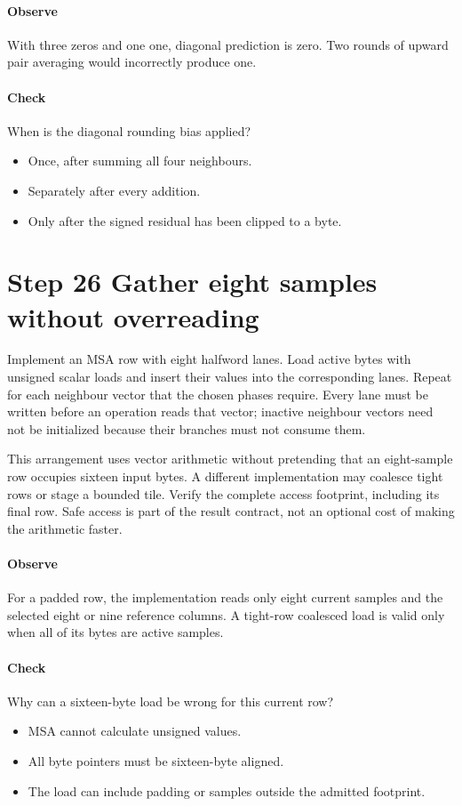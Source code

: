 \paragraph{Observe} With three zeros and one one, diagonal prediction is zero.
Two rounds of upward pair averaging would incorrectly produce one.
\paragraph{Check} When is the diagonal rounding bias applied?
\begin{itemize}
  \item[A.] Once, after summing all four neighbours.
  \item[B.] Separately after every addition.
  \item[C.] Only after the signed residual has been clipped to a byte.
\end{itemize}

\section{Step 26 Gather eight samples without overreading}\label{h263-prediction-s06}
Implement an MSA row with eight halfword lanes. Load active bytes with unsigned
scalar loads and insert their values into the corresponding lanes. Repeat for
each neighbour vector that the chosen phases require. Every lane must be written
before an operation reads that vector; inactive neighbour vectors need not be
initialized because their branches must not consume them.

This arrangement uses vector arithmetic without pretending that an eight-sample
row occupies sixteen input bytes. A different implementation may coalesce tight
rows or stage a bounded tile. Verify the complete access footprint, including
its final row. Safe access is part of the result contract, not an optional cost
of making the arithmetic faster.

\paragraph{Observe} For a padded row, the implementation reads only eight
current samples and the selected eight or nine reference columns. A tight-row
coalesced load is valid only when all of its bytes are active samples.
\paragraph{Check} Why can a sixteen-byte load be wrong for this current row?
\begin{itemize}
  \item[A.] MSA cannot calculate unsigned values.
  \item[B.] All byte pointers must be sixteen-byte aligned.
  \item[C.] The load can include padding or samples outside the admitted footprint.
\end{itemize}

